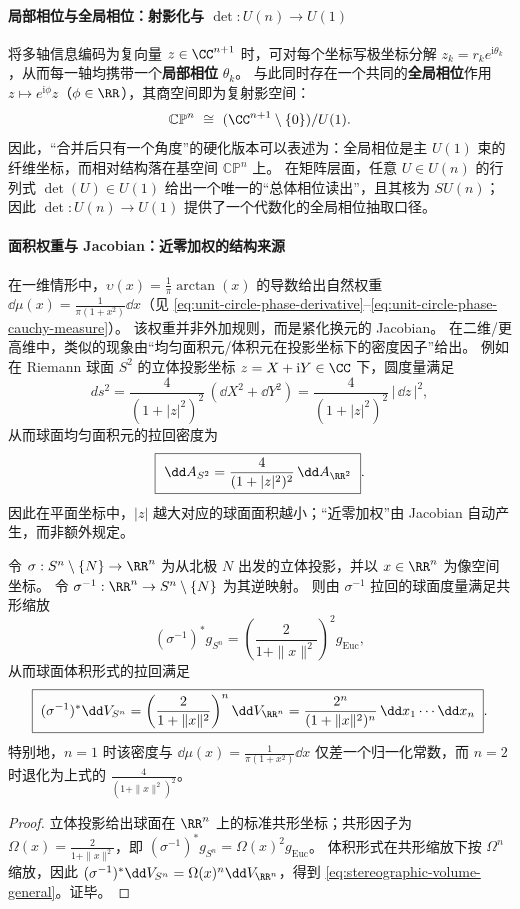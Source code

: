 \paragraph{局部相位与全局相位：射影化与 \texorpdfstring{$\det:U(n)\to U(1)$}{det}}
将多轴信息编码为复向量 \(z\in\CC^{n+1}\) 时，可对每个坐标写极坐标分解 \(z_k=r_k e^{\mathrm{i}\theta_k}\)，从而每一轴均携带一个\textbf{局部相位} \(\theta_k\)。
与此同时存在一个共同的\textbf{全局相位}作用 \(z\mapsto e^{\mathrm{i}\phi}z\)（\(\phi\in\RR\)），其商空间即为复射影空间：
\[
\mathbb{CP}^{n}\ \cong\ (\CC^{n+1}\setminus\{0\})/U(1).
\]
因此，“合并后只有一个角度”的硬化版本可以表述为：全局相位是主 \(U(1)\) 束的纤维坐标，而相对结构落在基空间 \(\mathbb{CP}^{n}\) 上。
在矩阵层面，任意 \(U\in U(n)\) 的行列式 \(\det(U)\in U(1)\) 给出一个唯一的“总体相位读出”，且其核为 \(SU(n)\)；因此 \(\det:U(n)\to U(1)\) 提供了一个代数化的全局相位抽取口径。

\paragraph{面积权重与 Jacobian：近零加权的结构来源}
在一维情形中，\(\upsilon(x)=\frac{1}{\pi}\arctan(x)\) 的导数给出自然权重 \(\dd\mu(x)=\frac{1}{\pi(1+x^2)}\dd x\)（见 \eqref{eq:unit-circle-phase-derivative}--\eqref{eq:unit-circle-phase-cauchy-measure}）。
该权重并非外加规则，而是紧化换元的 Jacobian。
在二维/更高维中，类似的现象由“均匀面积元/体积元在投影坐标下的密度因子”给出。
例如在 Riemann 球面 \(S^{2}\) 的立体投影坐标 \(z=X+\mathrm{i}Y\in\CC\) 下，圆度量满足
\[
ds^{2}=\frac{4}{(1+|z|^{2})^{2}}\,(\dd X^{2}+\dd Y^{2})
=\frac{4}{(1+|z|^{2})^{2}}\,|\,\dd z\,|^{2},
\]
从而球面均匀面积元的拉回密度为
\[
\boxed{\ \dd A_{S^{2}}=\frac{4}{(1+|z|^{2})^{2}}\,\dd A_{\RR^{2}}\ }.
\]
因此在平面坐标中，\(|z|\) 越大对应的球面面积越小；“近零加权”由 Jacobian 自动产生，而非额外规定。

\begin{proposition}\label{prop:stereographic-volume-form}
令 \(\sigma:S^{n}\setminus\{N\}\to\RR^{n}\) 为从北极 \(N\) 出发的立体投影，并以 \(x\in\RR^{n}\) 为像空间坐标。
令 \(\sigma^{-1}:\RR^{n}\to S^{n}\setminus\{N\}\) 为其逆映射。
则由 \(\sigma^{-1}\) 拉回的球面度量满足共形缩放
\[
(\sigma^{-1})^{\ast}g_{S^{n}}=\left(\frac{2}{1+\|x\|^{2}}\right)^{2}g_{\mathrm{Euc}},
\]
从而球面体积形式的拉回满足
\begin{equation}\label{eq:stereographic-volume-general}
\boxed{\;
(\sigma^{-1})^{\ast}\dd V_{S^{n}}
 =\left(\frac{2}{1+\|x\|^{2}}\right)^{n}\dd V_{\RR^{n}}
=\frac{2^{n}}{(1+\|x\|^{2})^{n}}\,\dd x_{1}\cdots \dd x_{n}\; }.
\end{equation}
特别地，\(n=1\) 时该密度与 \(\dd\mu(x)=\frac{1}{\pi(1+x^{2})}\dd x\) 仅差一个归一化常数，而 \(n=2\) 时退化为上式的 \(\frac{4}{(1+\|x\|^{2})^{2}}\)。
\end{proposition}
\begin{proof}
立体投影给出球面在 \(\RR^{n}\) 上的标准共形坐标；共形因子为 \(\Omega(x)=\frac{2}{1+\|x\|^{2}}\)，即 \((\sigma^{-1})^{\ast}g_{S^{n}}=\Omega(x)^{2}g_{\mathrm{Euc}}\)。
体积形式在共形缩放下按 \(\Omega^{n}\) 缩放，因此
\(
(\sigma^{-1})^{\ast}\dd V_{S^{n}}=\Omega(x)^{n}\dd V_{\RR^{n}}
\)，得到 \eqref{eq:stereographic-volume-general}。证毕。
\end{proof}

